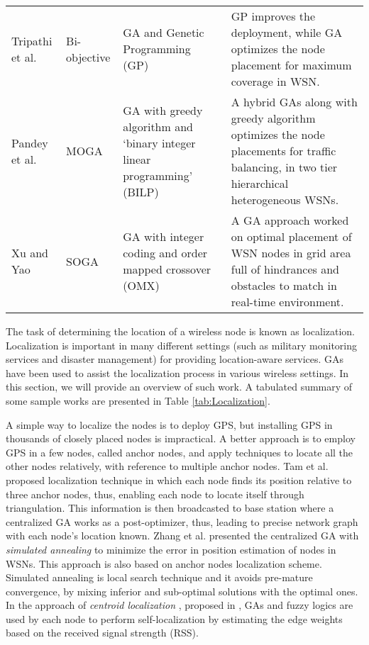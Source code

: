 \documentclass[journal]{IEEEtran}
\begin{document}
\begin{table*}
\begin{tabular}{p{1.8cm}  p{1.8cm} p{4cm} p{9.3cm}}
Tripathi et al. \cite{tripathi2011wireless}  & Bi-objective & GA and Genetic Programming (GP) &  GP improves the deployment, while GA optimizes the node placement for maximum coverage in WSN.\\

Pandey et al. \cite{pandey2007hybrid}  & MOGA & GA with greedy algorithm and `binary integer linear programming' (BILP) &  A hybrid GAs along with greedy algorithm optimizes the node placements for traffic balancing, in two tier hierarchical heterogeneous WSNs.\\ 

Xu and Yao \cite{xu2006ga}   & SOGA & GA with integer coding and order mapped crossover (OMX) &  A GA approach worked on optimal placement of WSN nodes in grid area full of hindrances and obstacles to match in real-time environment.\\ 

\bottomrule
\end{tabular}
\label{tab:AP_placement}
\end{table*}

The task of determining the location of a wireless node is known as localization. Localization is important in many different settings (such as military monitoring services and disaster management) for providing location-aware services. GAs have been used to assist the localization process in various wireless settings. In this section, we will provide an overview of such work. A tabulated summary of some sample works are presented in Table \ref{tab:Localization}. 

A simple way to localize the nodes is to deploy GPS, but installing GPS in thousands of closely placed nodes is impractical. A better approach is to employ GPS in a few nodes, called anchor nodes, and apply techniques to locate all the other nodes relatively, with reference to multiple anchor nodes. Tam et al. \cite{tam2006using} proposed localization technique in which each node finds its position relative to three anchor nodes, thus, enabling each node to locate itself through triangulation. This information is then broadcasted to base station where a centralized GA works as a post-optimizer, thus, leading to precise network graph with each node's location known. Zhang et al. presented the centralized GA with \emph{simulated annealing}\cite{zhang2008localization} to minimize the error in position estimation of nodes in WSNs. This approach is also based on anchor nodes localization scheme. Simulated annealing is local search technique and it avoids pre-mature convergence, by mixing inferior and sub-optimal solutions with the optimal ones. In the approach of \emph{centroid localization} \cite{yun2008centroid}, proposed in \cite{yun2008centroid}, GAs and fuzzy logics are used by each node to perform self-localization by estimating the edge weights based on the received signal strength (RSS).
\end{document}
